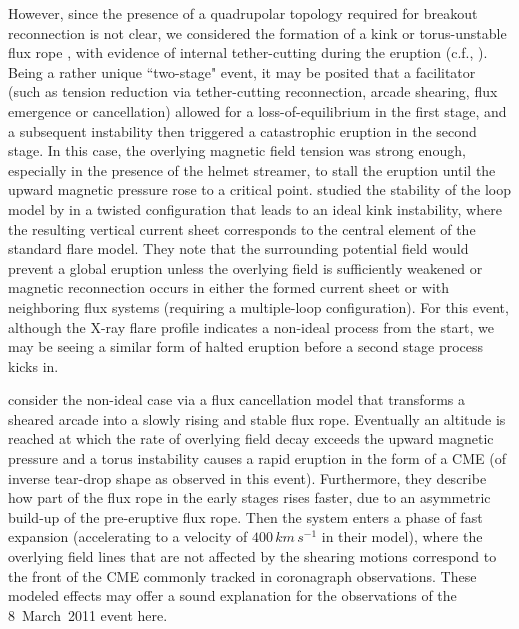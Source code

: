 \documentclass[namedreferences]{solarphysics}
\begin{document}
\begin{article}
{However, since the presence of a quadrupolar topology required for breakout reconnection is not clear, we considered the formation of a kink or torus-unstable flux rope \cite{2004A&A...413L..27T,2010ApJ...708..314A}, with evidence of internal tether-cutting during the eruption (c.f., ). Being a rather unique ``two-stage" event, it may be posited that a facilitator (such as tension reduction via tether-cutting reconnection, arcade shearing, flux emergence or cancellation) allowed for a loss-of-equilibrium in the first stage, and a subsequent instability then triggered a catastrophic eruption in the second stage. In this case, the overlying magnetic field tension was strong enough, especially in the presence of the helmet streamer, to stall the eruption until the upward magnetic pressure rose to a critical point.  studied the stability of the loop model by  in a twisted configuration that leads to an ideal kink instability, where the resulting vertical current sheet corresponds to the central element of the standard flare model. They note that the surrounding potential field would prevent a global eruption unless the overlying field is sufficiently weakened or magnetic reconnection occurs in either the formed current sheet or with neighboring flux systems (requiring a multiple-loop configuration). For this event, although the X-ray flare profile indicates a non-ideal process from the start, we may be seeing a similar form of halted eruption before a second stage process kicks in.

 consider the non-ideal case via a flux cancellation model that transforms a sheared arcade into a slowly rising and stable flux rope. Eventually an altitude is reached at which the rate of overlying field decay exceeds the upward magnetic pressure and a torus instability causes a rapid eruption in the form of a CME (of inverse tear-drop shape as observed in this event). Furthermore, they describe how part of the flux rope in the early stages rises faster, due to an asymmetric build-up of the pre-eruptive flux rope. Then the system enters a phase of fast expansion (accelerating to a velocity of $400\,km\,s^{-1}$ in their model), where the overlying field lines that are not affected by the shearing motions correspond to the front of the CME commonly tracked in coronagraph observations. These modeled effects may offer a sound explanation for the observations of the 8~March~2011 event here.


}
\end{article}
\end{document}
